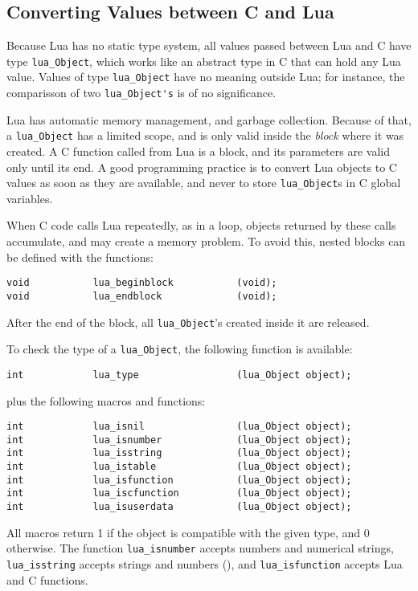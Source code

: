 \subsection{Converting Values between C and Lua} \label{valuesCLua}
Because Lua has no static type system,
all values passed between Lua and C have type
\verb'lua_Object',
which works like an abstract type in C that can hold any Lua value.
Values of type \verb'lua_Object' have no meaning outside Lua;
for instance,
the comparisson of two \verb"lua_Object's" is of no significance.

Lua has automatic memory management, and garbage collection.
Because of that, a \verb'lua_Object' has a limited scope,
and is only valid inside the {\em block\/} where it was created.
A C function called from Lua is a block,
and its parameters are valid only until its end.
A good programming practice is to convert Lua objects to C values
as soon as they are available,
and never to store \verb'lua_Object's in C global variables.

When C code calls Lua repeatedly, as in a loop,
objects returned by these calls accumulate,
and may create a memory problem.
To avoid this,
nested blocks can be defined with the functions:
\begin{verbatim}
void           lua_beginblock           (void);
void           lua_endblock             (void);
\end{verbatim}
After the end of the block,
all \verb'lua_Object''s created inside it are released.

To check the type of a \verb'lua_Object',
the following function is available:
\begin{verbatim}
int            lua_type                 (lua_Object object);
\end{verbatim}
plus the following macros and functions:
\begin{verbatim}
int            lua_isnil                (lua_Object object);
int            lua_isnumber             (lua_Object object);
int            lua_isstring             (lua_Object object);
int            lua_istable              (lua_Object object);
int            lua_isfunction           (lua_Object object);
int            lua_iscfunction          (lua_Object object);
int            lua_isuserdata           (lua_Object object);
\end{verbatim}
All macros return 1 if the object is compatible with the given type,
and 0 otherwise.
The function \verb'lua_isnumber' accepts numbers and numerical strings,
\verb'lua_isstring' accepts strings and numbers (),
and \verb'lua_isfunction' accepts Lua and C functions.

